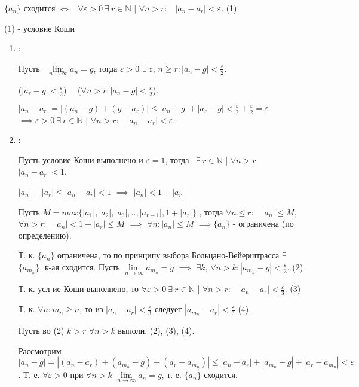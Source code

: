 \documentclass{article}
\begin{document}

$\{a_n\}$ сходится $\Leftrightarrow$ \ $\forall \varepsilon>0 \ \exists \ r \in \mathbb{N} $ | $\forall n>r:$ \ $|a_n-a_r|<\varepsilon$. (1)

(1) - условие Коши

\proof

\begin{enumerate}[I]

\item \onlyif:

Пусть \exists \ $\lim\limits_{n\to\infty}{a_n}=g$, тогда \forall $\varepsilon>0$ $\exists$ r, \forall $n\geq r: |a_n-g|<\frac{\varepsilon}{2}$.

($|a_r-g|<\frac{\varepsilon}{2}$) \ \bigwedge \ ($\forall n>r: |a_n-g|<\frac{\varepsilon}{2}$).

$|a_n-a_r|=|(a_n-g)+(g-a_r)|\leq |a_n-g|+|a_r-g|<\frac{\varepsilon}{2}+\frac{\varepsilon}{2}=\varepsilon$ $\implies \varepsilon>0 \ \exists \ r \in \mathbb{N} $ | $\forall n>r:$ \ $|a_n-a_r|<\varepsilon$.

\item \enough:

Пусть условие Коши выполнено и $\varepsilon=1$, тогда \ $\exists \ r \in \mathbb{N} $ | $\forall n>r:$ \ $|a_n-a_r|<1$.

$|a_n|-|a_r|\leq |a_n-a_r|<1$ $\implies$ $|a_n|<1+|a_r|$

Пусть $M=max\{|a_1|, |a_2|, |a_3|,.., |a_{r-1}|, 1+|a_r|\}$ , тогда $\forall n\leq r:$ \ $|a_n|\leq M$, $\forall n>r:$ \ $|a_n|<1+|a_r|\leq M$ $\implies$ $\forall n: |a_n|\leq M$ $\implies \{a_n\}$ - ограничена (по определению).

Т. к. $\{a_n\}$ ограничена, то по принципу выбора Больцано-Вейерштрасса $\exists$ \ $\{a_{m_n}\}$, к-ая сходится. Пусть $\lim\limits_{n\to\infty}{a_{m_n}}=g$ $\implies$ $\exists k$, $\forall n>k: |a_{m_n}-g|<\frac{\varepsilon}{3}$. (2)  

 Т. к. усл-ие Коши выполнено, то $\forall \varepsilon>0 \ \exists \ r \in \mathbb{N} $ | $\forall n>r:$ \ $|a_n-a_r|<\frac{\varepsilon}{3}$. (3)

 Т. к. $\forall n: m_n\geq n$, то из $|a_n-a_r|<\frac{\varepsilon}{3}$ следует $|a_{m_n}-a_r|<\frac{\varepsilon}{3}$ (4).

Пусть во (2) $k>r$ \implies $\forall n>k$ выполн. (2), (3), (4).

Рассмотрим $|a_n-g|=|(a_n-a_r)+(a_{m_n}-g)+(a_r-a_{m_n})|\leq |a_n-a_r|+|a_{m_n}-g|+|a_r-a_{m_n}|<\varepsilon$. Т. е. $\forall \varepsilon >0$ при $\forall n>k$ \implies $\lim\limits_{n\to\infty}{a_n}=g$, т. е. $\{a_n\}$  сходится.


\end{enumerate}
\end{document}
